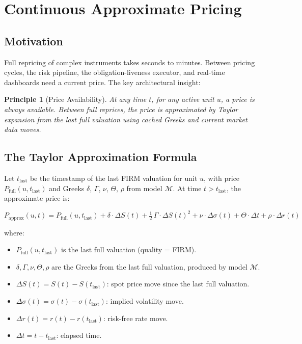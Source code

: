 \documentclass[11pt,a4paper]{article}
\newtheorem{principle}[definition]{Principle}
\begin{document}
\clearpage
\section{Continuous Approximate Pricing}
\label{sec:approx-pricing}

\subsection{Motivation}

Full repricing of complex instruments takes seconds to minutes.  Between pricing cycles, the risk pipeline, the obligation-liveness executor, and real-time dashboards need a current price.  The key architectural insight:

\begin{principle}[Price Availability]
\label{princ:price-availability}
At any time $t$, for any active unit $u$, a price is always available.  Between full reprices, the price is approximated by Taylor expansion from the last full valuation using cached Greeks and current market data moves.
\end{principle}

\subsection{The Taylor Approximation Formula}

Let $t_{\mathrm{last}}$ be the timestamp of the last FIRM valuation for unit $u$, with price $P_{\mathrm{full}}(u, t_{\mathrm{last}})$ and Greeks $\delta$, $\Gamma$, $\nu$, $\Theta$, $\rho$ from model $\mathcal{M}$.  At time $t > t_{\mathrm{last}}$, the approximate price is:

\begin{equation}
\label{eq:taylor-approx}
\boxed{
P_{\mathrm{approx}}(u, t) = P_{\mathrm{full}}(u, t_{\mathrm{last}}) + \delta \cdot \Delta S(t) + \tfrac{1}{2}\,\Gamma \cdot \Delta S(t)^2 + \nu \cdot \Delta\sigma(t) + \Theta \cdot \Delta t + \rho \cdot \Delta r(t)
}
\end{equation}

where:
\begin{itemize}[nosep]
\item $P_{\mathrm{full}}(u, t_{\mathrm{last}})$ is the last full valuation (quality = FIRM).
\item $\delta, \Gamma, \nu, \Theta, \rho$ are the Greeks from the last full valuation, produced by model $\mathcal{M}$.
\item $\Delta S(t) = S(t) - S(t_{\mathrm{last}})$: spot price move since the last full valuation.
\item $\Delta\sigma(t) = \sigma(t) - \sigma(t_{\mathrm{last}})$: implied volatility move.
\item $\Delta r(t) = r(t) - r(t_{\mathrm{last}})$: risk-free rate move.
\item $\Delta t = t - t_{\mathrm{last}}$: elapsed time.
\end{itemize}
\end{document}

